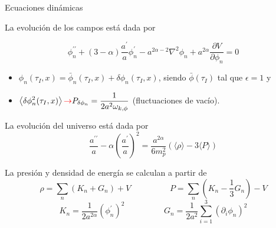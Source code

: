 \documentclass{beamer}
\begin{document}
            \begin{frame}{Ecuaciones dinámicas}
                \begin{itemize}
                    \item[\textcolor{brown}{$\bullet$}] La evolución de los campos está dada por
                        \small{\begin{equation*}
                            \phi^{\prime \prime}_n + (3 - \alpha) \frac{a^{\prime}}{a} \phi^\prime_n - a^{2 \alpha - 2} \nabla^2 \phi_n + a^{2 \alpha} \frac{\partial V}{\partial \phi_n} = 0
                        \end{equation*}
                        \vspace{-0.5cm}
                        \begin{itemize}
                            \item[\textcolor{cyan}{$\Longrightarrow$}] $\phi_n (\tau_I, x) = \bar{\phi}_n (\tau_I, x) + \delta \phi_n (\tau_I, x)$, siendo $\bar{\phi} (\tau_I)$ tal que $\epsilon = 1$ y 
                            \item[] $\displaystyle \left\langle \delta \phi^2_n (\tau_I, x) \right\rangle \textcolor{red}{\to} P_{\delta \phi_n} = \frac{1}{2a^2 \omega_{k,\phi}}$ (fluctuaciones de vacío).
                        \end{itemize}
                    \item[\textcolor{brown}{$\bullet$}] La evolución del universo está dada por
                        \begin{equation*}
                            \frac{a^{\prime \prime}}{a} - \alpha \left( \frac{a^\prime}{a} \right)^2 = \frac{a^{2 \alpha}}{6 m_p^2} (\langle \rho \rangle - 3 \langle P \rangle)
                        \end{equation*} 
                    \item[\textcolor{brown}{$\bullet$}] La presión y densidad de energía se calculan a partir de 
                        \begin{equation*}
                            \rho = \sum_n \left( K_n + G_n \right) + V \hspace{2cm} P = \sum_n \left( K_n - \frac{1}{3} G_n \right) - V
                        \end{equation*}
                        \begin{equation*}
                            K_n = \frac{1}{2 a^{2\alpha}} \left( \phi^\prime_n \right)^2 \hspace{2cm} G_n = \frac{1}{2a^2} \sum_{i = 1}^3 \left( \partial_i \phi_n \right)^2
                        \end{equation*}}
                \end{itemize}
            \end{frame}
\end{document}
